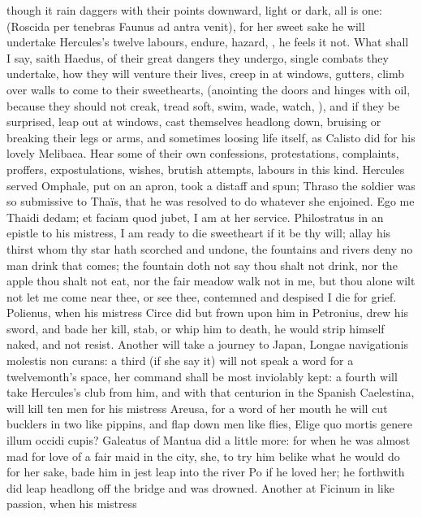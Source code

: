 {though it rain daggers with their points downward, light or dark, all
is one: (Roscida per tenebras Faunus ad antra venit), for her sweet
sake he will undertake Hercules's twelve labours, endure, hazard, \etc{},
he feels it not. What shall I say, saith Haedus, of their great
dangers they undergo, single combats they undertake, how they will
venture their lives, creep in at windows, gutters, climb over walls to
come to their sweethearts, (anointing the doors and hinges with oil,
because they should not creak, tread soft, swim, wade, watch, \etc{}), and
if they be surprised, leap out at windows, cast themselves headlong
down, bruising or breaking their legs or arms, and sometimes loosing
life itself, as Calisto did for his lovely Melibaea. Hear some of their
own confessions, protestations, complaints, proffers, expostulations,
wishes, brutish attempts, labours in this kind. Hercules served
Omphale, put on an apron, took a distaff and spun; Thraso the soldier
was so submissive to Thaïs, that he was resolved to do whatever she
enjoined. Ego me Thaidi dedam; et faciam quod jubet, I am at her
service. Philostratus in an epistle to his mistress, I am ready
to die sweetheart if it be thy will; allay his thirst whom thy star
hath scorched and undone, the fountains and rivers deny no man drink
that comes; the fountain doth not say thou shalt not drink, nor the
apple thou shalt not eat, nor the fair meadow walk not in me, but thou
alone wilt not let me come near thee, or see thee, contemned and
despised I die for grief. Polienus, when his mistress Circe did but
frown upon him in Petronius, drew his sword, and bade her kill,
stab, or whip him to death, he would strip himself naked, and not
resist. Another will take a journey to Japan, Longae navigationis
molestis non curans: a third (if she say it) will not speak a word for
a twelvemonth's space, her command shall be most inviolably kept: a
fourth will take Hercules's club from him, and with that centurion in
the Spanish Caelestina, will kill ten men for his mistress
Areusa, for a word of her mouth he will cut bucklers in two like
pippins, and flap down men like flies, Elige quo mortis genere illum
occidi cupis? Galeatus of Mantua did a little more: for when he
was almost mad for love of a fair maid in the city, she, to try him
belike what he would do for her sake, bade him in jest leap into the
river Po if he loved her; he forthwith did leap headlong off the bridge
and was drowned. Another at Ficinum in like passion, when his mistress
}
